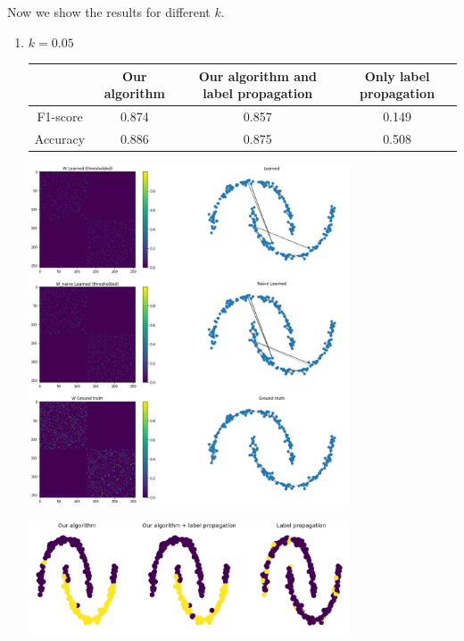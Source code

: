 \documentclass[a4paper]{article}
\begin{document}
\newpage

Now we show the results for different $k$.

\begin{enumerate}
    \item $k = 0.05$
        \begin{center}
            \begin{tabular}{|c|c|c|c|}
                \hline
                    & Our algorithm & Our algorithm and label propagation & Only label propagation\\
                \hline
                F1-score & 0.874 & 0.857 & 0.149 \\
                \hline
                Accuracy & 0.886 & 0.875 & 0.508 \\
                \hline
            \end{tabular}
        \end{center}
        \begin{center}
            \includegraphics[width=0.75\textwidth]{images/p4/5_percent_learned_graphs.png}
        \end{center}
        \begin{center}
            \includegraphics[width=0.75\textwidth]{images/p4/5_percent_predicted_labels.png}

\end{center}
\end{enumerate}
\end{document}
